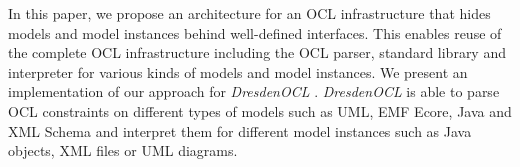   In this paper, we propose an architecture for an OCL
	infrastructure that hides models and model instances behind well-defined interfaces.
	This enables reuse of the complete OCL infrastructure including the OCL parser, 
	standard library and interpreter for various kinds of models and model instances. We present an
	implementation of our approach for \textit{DresdenOCL}
	\cite{WWW:dresdenOCL}. \textit{DresdenOCL} is able to parse OCL
	constraints on different types of models such as UML, EMF Ecore, Java and 
	XML Schema and interpret them for different model instances such as Java 
	objects, XML files or {UML diagrams}.
	
		
